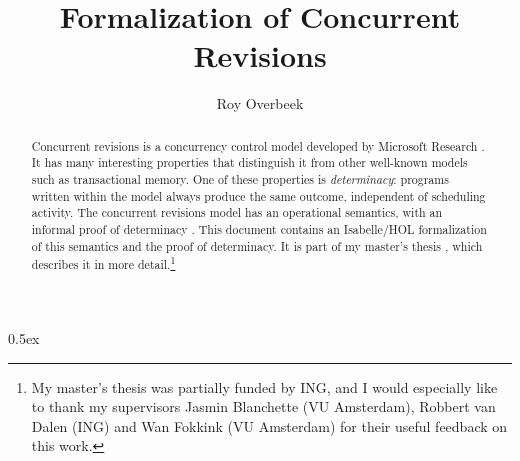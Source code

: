 \documentclass[11pt,a4paper]{article}
\begin{document}
\title{Formalization of Concurrent Revisions}
\author{Roy Overbeek}
\maketitle

\begin{abstract}
\noindent Concurrent revisions is a concurrency control model developed by Microsoft Research \cite{burckhardt2010concurrent}. It has many interesting properties that distinguish it from other well-known models such as transactional memory. One of these properties is \emph{determinacy}: programs written within the model always produce the same outcome, independent of scheduling activity. The concurrent revisions model has an operational semantics, with an informal proof of determinacy \cite{burckhardt2011semantics}. This document contains an Isabelle/HOL formalization of this semantics and the proof of determinacy. It is part of my master's thesis \cite{overbeek2018formalizing}, which describes it in more detail.\footnote{My master's thesis was partially funded by ING, and I would especially like to thank my supervisors Jasmin Blanchette (VU Amsterdam), Robbert van Dalen (ING) and Wan Fokkink (VU Amsterdam) for their useful feedback on this work.
}
\end{abstract}

\tableofcontents

\pagebreak

\parindent 0pt\parskip 0.5ex





\end{document}
